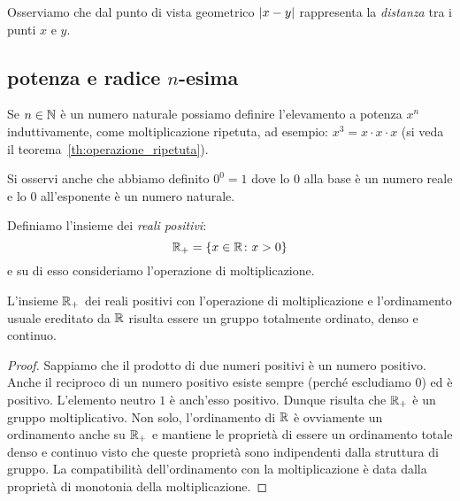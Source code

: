 Osserviamo che dal punto di vista geometrico
${\left|x-y\right|}$ rappresenta la \emph{distanza} tra i punti
$x$ e $y$.


\subsection{potenza e radice $n$-esima}
%
%
\label{sec:potenza}%
\label{sec:radice}%

Se $n \in {\mathbb N}$ è un numero naturale possiamo definire 
l'elevamento a potenza $x^n$ induttivamente, come moltiplicazione 
ripetuta, ad esempio: $x^3 = x\cdot x \cdot x$
(si veda il teorema~\ref{th:operazione_ripetuta}).

Si osservi anche che abbiamo definito $0^0=1$ dove lo $0$ 
alla base è un numero reale e lo $0$ all'esponente 
è un numero naturale.


Definiamo l'insieme dei \emph{reali positivi}:
\[
{\mathbb R}_+ = {\left\{ x\in {\mathbb R}\colon x>0 \right\}}
\]
e su di esso consideriamo l'operazione di moltiplicazione.

\begin{theorem}
  \label{th:gruppo_moltiplicativo}%
L'insieme ${\mathbb R}_+$ dei reali positivi con l'operazione di moltiplicazione 
e l'ordinamento usuale ereditato da ${\mathbb R}$ risulta essere 
un gruppo totalmente ordinato, denso e continuo.
\end{theorem}
%
\begin{proof}
Sappiamo che il prodotto di due numeri positivi 
è un numero positivo. Anche il reciproco di un numero positivo
esiste sempre (perché escludiamo $0$) ed è positivo. 
L'elemento neutro $1$ è anch'esso positivo. 
Dunque risulta che ${\mathbb R}_+$ è un gruppo moltiplicativo.
Non solo, l'ordinamento di ${\mathbb R}$ è ovviamente un ordinamento anche su ${\mathbb R}_+$
e mantiene le proprietà di essere un ordinamento totale 
denso e continuo visto che queste proprietà sono indipendenti dalla struttura di gruppo.
La compatibilità dell'ordinamento con la moltiplicazione 
è data dalla proprietà di monotonia della moltiplicazione.
\end{proof}

